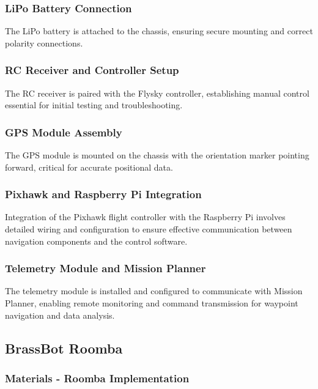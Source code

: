 \documentclass{scrarticle}
\begin{document}
\subsubsection{LiPo Battery Connection}
The LiPo battery is attached to the chassis, ensuring secure mounting and correct polarity connections.

\subsubsection{RC Receiver and Controller Setup}
The RC receiver is paired with the Flysky controller, establishing manual control essential for initial testing and troubleshooting.

\subsubsection{GPS Module Assembly}
The GPS module is mounted on the chassis with the orientation marker pointing forward, critical for accurate positional data.

\subsubsection{Pixhawk and Raspberry Pi Integration}
Integration of the Pixhawk flight controller with the Raspberry Pi involves detailed wiring and configuration to ensure effective communication between navigation components and the control software.

\subsubsection{Telemetry Module and Mission Planner}
The telemetry module is installed and configured to communicate with Mission Planner, enabling remote monitoring and command transmission for waypoint navigation and data analysis.

\subsection{BrassBot Roomba}

\subsubsection{Materials - Roomba Implementation}
\end{document}
